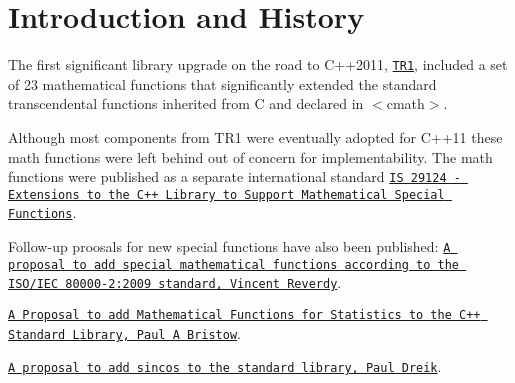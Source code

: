 \hypertarget{index_intro}{}\section{Introduction and History}\label{index_intro}
The first significant library upgrade on the road to C++2011, \href{http://www.open-std.org/JTC1/SC22/WG21/docs/papers/2005/n1836.pdf}{\tt T\+R1}, included a set of 23 mathematical functions that significantly extended the standard transcendental functions inherited from C and declared in $<$cmath$>$.

Although most components from T\+R1 were eventually adopted for C++11 these math functions were left behind out of concern for implementability. The math functions were published as a separate international standard \href{http://www.open-std.org/JTC1/SC22/WG21/docs/papers/2010/n3060.pdf}{\tt IS 29124 -\/ Extensions to the C++ Library to Support Mathematical Special Functions}.

Follow-\/up proosals for new special functions have also been published\+: \href{http://open-std.org/JTC1/SC22/WG21/docs/papers/2013/n3494.pdf}{\tt A proposal to add special mathematical functions according to the I\+S\+O/\+I\+EC 80000-\/2\+:2009 standard, Vincent Reverdy}.

\href{http://open-std.org/JTC1/SC22/WG21/docs/papers/2004/n1668.pdf}{\tt A Proposal to add Mathematical Functions for Statistics to the C++ Standard Library, Paul A Bristow}.

\href{http://www.open-std.org/jtc1/sc22/wg21/docs/papers/2015/p0081r0.pdf}{\tt A proposal to add sincos to the standard library, Paul Dreik}.

